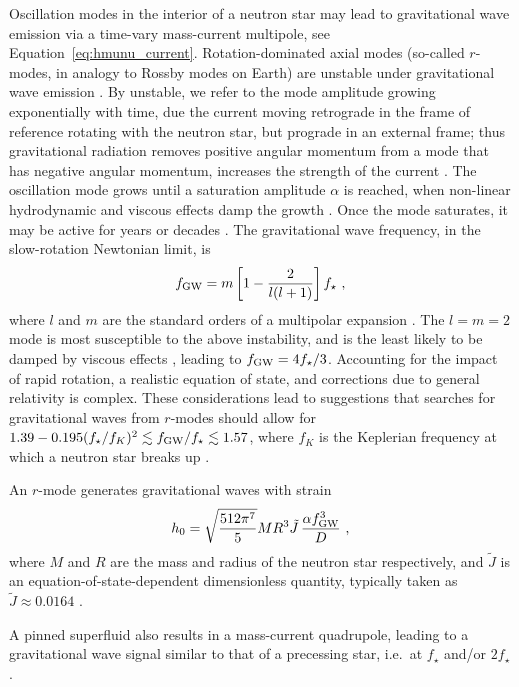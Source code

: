 Oscillation modes in the interior of a neutron star may lead to gravitational wave emission via a time-vary mass-current multipole, see Equation~\eqref{eq:hmunu_current}. Rotation-dominated axial modes (so-called $r$-modes, in analogy to Rossby modes on Earth) are unstable under gravitational wave emission \citep{Andersson1998,Friedman1998,Owen1998}. By unstable, we refer to the mode amplitude growing exponentially with time, due the current moving retrograde in the frame of reference rotating with the neutron star, but prograde in an external frame; thus gravitational radiation removes positive angular momentum from a mode that has negative angular momentum, increases the strength of the current \citep{Friedman1998}. The oscillation mode grows until a saturation amplitude $\alpha$ is reached, when non-linear hydrodynamic and viscous effects damp the growth \citep{Alford2012}. Once the mode saturates, it may be active for years or decades \citep{Arras2003}. The gravitational wave frequency, in the slow-rotation Newtonian limit, is 
\begin{equation}
    f_{\rm GW} = m \left[1 - \frac{2}{l(l+1)}\right] f_\star\ , \label{eq:fgw_rmode}
\end{equation}
where $l$ and $m$ are the standard orders of a multipolar expansion \citep{Papaloizou1978}. The $l=m=2$ mode is most susceptible to the above instability, and is the least likely to be damped by viscous effects \citep{Lindblom1998,Andersson1999}, leading to $f_{\rm GW} = 4f_\star / 3$. Accounting for the impact of rapid rotation, a realistic equation of state, and corrections due to general relativity is complex. These considerations lead to suggestions that searches for gravitational waves from $r$-modes should allow for $1.39 - 0.195 (f_\star / f_{K})^2 \lesssim f_{\rm GW} / f_\star \lesssim 1.57$, where $f_K$ is the Keplerian frequency at which a neutron star breaks up \citep{Idrisy2015,Caride2019}. 

An $r$-mode generates gravitational waves with strain
\begin{equation}
    h_0 = \sqrt{\frac{512 \pi^7}{5}} M R^3 \tilde{J}\, \frac{\alpha f_{\rm GW}^3}{D}\ , \label{eq:h0_alpha}
\end{equation}
where $M$ and $R$ are the mass and radius of the neutron star respectively, and $\tilde{J}$ is an equation-of-state-dependent dimensionless quantity, typically taken as $\tilde{J} \approx 0.0164$ \citep{Owen1998,Owen2010}. 

A pinned superfluid also results in a mass-current quadrupole, leading to a gravitational wave signal similar to that of a precessing star, i.e.~at $f_\star$ and/or $2f_\star$ \citep{Peralta2006,Eysden2008,Bennett2010,Jones2010,Melatos2015}.


